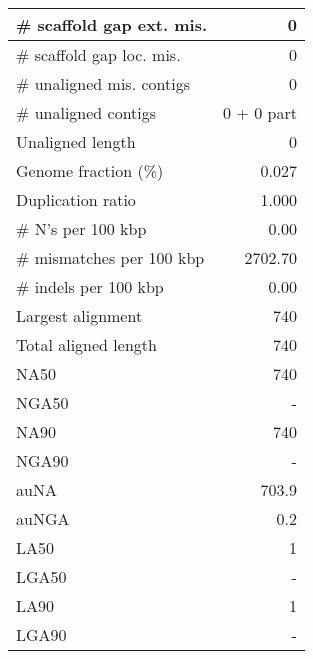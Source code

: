 \documentclass[12pt,a4paper]{article}
\begin{document}
\begin{table}[ht]
\begin{center}
\begin{tabular}{|l*{1}{|r}|}
\# scaffold gap ext. mis. & 0 \\ \hline
\# scaffold gap loc. mis. & 0 \\ \hline
\# unaligned mis. contigs & 0 \\ \hline
\# unaligned contigs & 0 + 0 part \\ \hline
Unaligned length & 0 \\ \hline
Genome fraction (\%) & 0.027 \\ \hline
Duplication ratio & 1.000 \\ \hline
\# N's per 100 kbp & 0.00 \\ \hline
\# mismatches per 100 kbp & 2702.70 \\ \hline
\# indels per 100 kbp & 0.00 \\ \hline
Largest alignment & 740 \\ \hline
Total aligned length & 740 \\ \hline
NA50 & 740 \\ \hline
NGA50 & - \\ \hline
NA90 & 740 \\ \hline
NGA90 & - \\ \hline
auNA & 703.9 \\ \hline
auNGA & 0.2 \\ \hline
LA50 & 1 \\ \hline
LGA50 & - \\ \hline
LA90 & 1 \\ \hline
LGA90 & - \\ \hline
\end{tabular}
\end{center}
\end{table}
\end{document}
